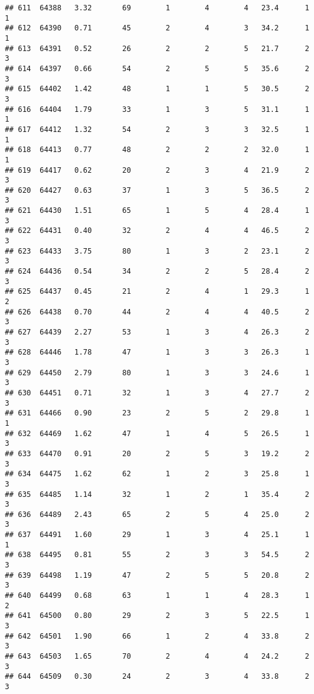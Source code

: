\documentclass[
]{article}
\begin{document}
\begin{verbatim}
## 611  64388   3.32       69        1        4        4   23.4      1      1
## 612  64390   0.71       45        2        4        3   34.2      1      1
## 613  64391   0.52       26        2        2        5   21.7      2      3
## 614  64397   0.66       54        2        5        5   35.6      2      3
## 615  64402   1.42       48        1        1        5   30.5      2      3
## 616  64404   1.79       33        1        3        5   31.1      1      1
## 617  64412   1.32       54        2        3        3   32.5      1      1
## 618  64413   0.77       48        2        2        2   32.0      1      1
## 619  64417   0.62       20        2        3        4   21.9      2      3
## 620  64427   0.63       37        1        3        5   36.5      2      3
## 621  64430   1.51       65        1        5        4   28.4      1      3
## 622  64431   0.40       32        2        4        4   46.5      2      3
## 623  64433   3.75       80        1        3        2   23.1      2      3
## 624  64436   0.54       34        2        2        5   28.4      2      3
## 625  64437   0.45       21        2        4        1   29.3      1      2
## 626  64438   0.70       44        2        4        4   40.5      2      3
## 627  64439   2.27       53        1        3        4   26.3      2      3
## 628  64446   1.78       47        1        3        3   26.3      1      3
## 629  64450   2.79       80        1        3        3   24.6      1      3
## 630  64451   0.71       32        1        3        4   27.7      2      3
## 631  64466   0.90       23        2        5        2   29.8      1      1
## 632  64469   1.62       47        1        4        5   26.5      1      3
## 633  64470   0.91       20        2        5        3   19.2      2      3
## 634  64475   1.62       62        1        2        3   25.8      1      3
## 635  64485   1.14       32        1        2        1   35.4      2      3
## 636  64489   2.43       65        2        5        4   25.0      2      3
## 637  64491   1.60       29        1        3        4   25.1      1      1
## 638  64495   0.81       55        2        3        3   54.5      2      3
## 639  64498   1.19       47        2        5        5   20.8      2      3
## 640  64499   0.68       63        1        1        4   28.3      1      2
## 641  64500   0.80       29        2        3        5   22.5      1      3
## 642  64501   1.90       66        1        2        4   33.8      2      3
## 643  64503   1.65       70        2        4        4   24.2      2      3
## 644  64509   0.30       24        2        3        4   33.8      2      3

\end{verbatim}
\end{document}
